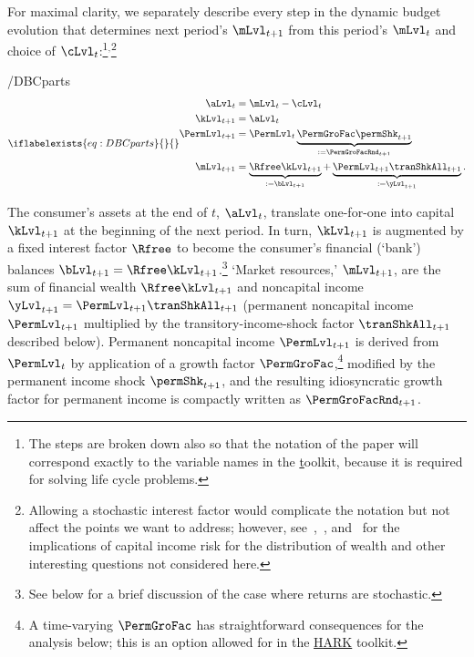 \documentclass[BufferStockTheory]{subfiles}
\begin{document}
\hypertarget{checkRestrictions}{}
\hypertarget{DBCparts}{}
For maximal clarity, we separately describe every step in the dynamic budget evolution that determines next period's $\mLvl_{t+1}$ from this period's $\mLvl_{t}$ and choice of $\cLvl_{t}$:\footnote{The steps are broken down also so that the notation of the paper will correspond exactly to the variable names in the \href{https://github.com/econ-ark/HARK} toolkit, because it is required for solving life cycle problems.}$^{,}$\footnote{Allowing a stochastic interest factor would complicate the notation but not affect the points we want to address; however, see~\cite{benhabibWealth},~\cite{maTodaRich}, and~\cite{mstIncFluct} for the implications of capital income risk for the distribution of wealth and other interesting questions not considered here.}

\begin{verbatimwrite}{\EqDir/DBCparts}
  \begin{equation}\iflabelexists{eq:DBCparts}{}{\label{eq:DBCparts}} %
    \begin{split}
      \aLvl_{t}     & = \mLvl_{t}-\cLvl_{t}  \\
      \kLvl_{t+1}   & = \aLvl_{t} \notag \\
      \PermLvl_{t+1}  & = \PermLvl_{t} \underbrace{\PermGroFac\permShk_{t+1}}_{:= \PermGroFacRnd_{t+1}} \notag \\
      \mLvl_{t+1}  & =   \underbrace{\Rfree \kLvl_{t+1}}_{:= \bLvl_{t+1}}  +\underbrace{\PermLvl_{t+1}\tranShkAll_{t+1}}_{:= \yLvl_{t+1}}. \notag
    \end{split}
  \end{equation}
\end{verbatimwrite}


The consumer's assets at the end of $t$, $\aLvl_{t}$, translate one-for-one into capital $\kLvl_{t+1}$ at the beginning of the next period. In turn, $\kLvl_{t+1}$ is augmented by a fixed interest factor $\Rfree$ to become the consumer's financial (`bank') balances $\bLvl_{t+1} = \Rfree \kLvl_{t+1}$.\footnote{See below for a brief discussion of the case where returns are stochastic.} `Market resources,' $\mLvl_{t+1}$,  are the sum of financial wealth $\Rfree \kLvl_{t+1}$ and noncapital income $\yLvl_{t+1}=\PermLvl_{t+1}\tranShkAll_{t+1}$ (permanent noncapital income $\PermLvl_{t+1}$ multiplied by the transitory-income-shock factor $\tranShkAll_{t+1}$ described below). Permanent noncapital income $\PermLvl_{t+1}$ is derived from $\PermLvl_{t}$ by application of a growth factor $\PermGroFac$,\footnote{A time-varying $\PermGroFac$ has straightforward consequences for the analysis below; this is an option allowed for in the \href{https://econ-ark.org}{HARK} toolkit.} modified by the permanent income shock $\permShk_{t+1}$, and the resulting idiosyncratic growth factor for permanent income is compactly written as $\PermGroFacRnd_{t+1}$. 
\end{document}
